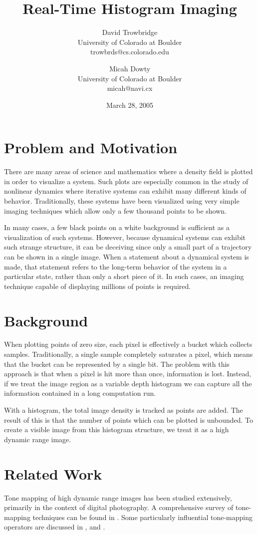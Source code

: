 \documentclass[letterpaper, 12pt]{article}
\title{Real-Time Histogram Imaging}
\author{
	David Trowbridge \\ University of Colorado at Boulder \\ trowbrds@cs.colorado.edu
\and
	Micah Dowty \\ University of Colorado at Boulder \\ micah@navi.cx
}
\date{March 28, 2005}
\begin{document}
\maketitle

\section{Problem and Motivation}
There are many areas of science and mathematics where a density field is plotted in order
to visualize a system.  Such plots are especially common in the study of nonlinear dynamics
where iterative systems can exhibit many different kinds of behavior.  Traditionally, these
systems have been visualized using very simple imaging techniques which allow only a few
thousand points to be shown.

In many cases, a few black points on a white background is sufficient as a visualization
of such systems.  However, because dynamical systems can exhibit such strange structure,
it can be deceiving since only a small part of a trajectory can be shown in a single image.
When a statement about a dynamical system is made, that statement refers to the long-term
behavior of the system in a particular state, rather than only a short piece of it.  In such
cases, an imaging technique capable of displaying millions of points is required.

\section{Background}
When plotting points of zero size, each pixel is effectively a bucket which collects samples.
Traditionally, a single sample completely saturates a pixel, which means that the bucket
can be represented by a single bit.  The problem with this approach is that when a pixel is
hit more than once, information is lost.  Instead, if we treat the image region as a variable
depth histogram we can capture all the information contained in a long computation run.

With a histogram, the total image density is tracked as points are added.  The result of this
is that the number of points which can be plotted is unbounded.  To create a visible image
from this histogram structure, we treat it as a high dynamic range image.  

\section{Related Work}
Tone mapping of high dynamic range images has been studied extensively, primarily in the
context of digital photography.  A comprehensive survey of tone-mapping techniques can be
found in \cite{kd}.  Some particularly influential tone-mapping operators are discussed
in \cite{jt}, \cite{jtjhbg} and \cite{gw}.
\end{document}

